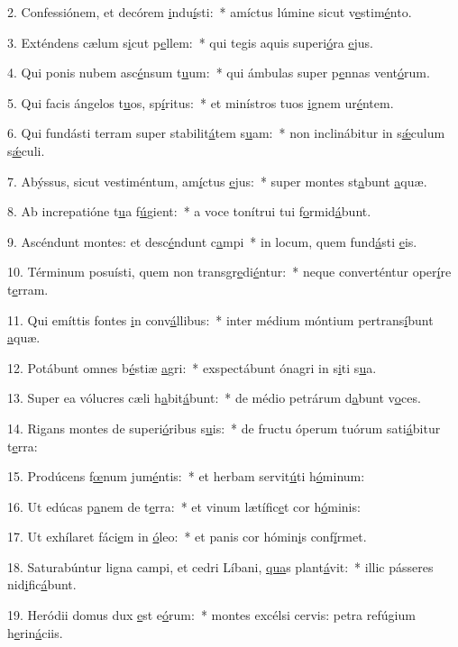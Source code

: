 2. Confessiónem, et decórem \uline{i}ndu\uline{í}sti:~* amíctus lúmine sicut v\uline{e}stim\uline{é}nto.\par 
3. Exténdens cælum s\uline{i}cut p\uline{e}llem:~* qui tegis aquis superi\uline{ó}ra \uline{e}jus.\par 
4. Qui ponis nubem asc\uline{é}nsum t\uline{u}um:~* qui ámbulas super p\uline{e}nnas vent\uline{ó}rum.\par 
5. Qui facis ángelos t\uline{u}os, sp\uline{í}ritus:~* et minístros tuos \uline{i}gnem ur\uline{é}ntem.\par 
6. Qui fundásti terram super stabilit\uline{á}tem s\uline{u}am:~* non inclinábitur in s\uline{ǽ}culum s\uline{ǽ}culi.\par 
7. Abýssus, sicut vestiméntum, am\uline{í}ctus \uline{e}jus:~* super montes st\uline{a}bunt \uline{a}quæ.\par 
8. Ab increpatióne t\uline{u}a f\uline{ú}gient:~* a voce tonítrui tui f\uline{o}rmid\uline{á}bunt.\par 
9. Ascéndunt montes: et desc\uline{é}ndunt c\uline{a}mpi~* in locum, quem fund\uline{á}sti \uline{e}is.\par 
10. Términum posuísti, quem non transgr\uline{e}di\uline{é}ntur:~* neque converténtur oper\uline{í}re t\uline{e}rram.\par 
11. Qui emíttis fontes \uline{i}n conv\uline{á}llibus:~* inter médium móntium pertrans\uline{í}bunt \uline{a}quæ.\par 
12. Potábunt omnes b\uline{é}stiæ \uline{a}gri:~* exspectábunt ónagri in s\uline{i}ti s\uline{u}a.\par 
13. Super ea vólucres cæli h\uline{a}bit\uline{á}bunt:~* de médio petrárum d\uline{a}bunt v\uline{o}ces.\par 
14. Rigans montes de superi\uline{ó}ribus s\uline{u}is:~* de fructu óperum tuórum sati\uline{á}bitur t\uline{e}rra:\par 
15. Prodúcens f\uline{œ}num jum\uline{é}ntis:~* et herbam servit\uline{ú}ti h\uline{ó}minum:\par 
16. Ut edúcas p\uline{a}nem de t\uline{e}rra:~* et vinum lætífic\uline{e}t cor h\uline{ó}minis:\par 
17. Ut exhílaret fáci\uline{e}m in \uline{ó}leo:~* et panis cor hómin\uline{i}s conf\uline{í}rmet.\par 
18. Saturabúntur ligna campi, et cedri Líbani, \uline{qua}s plant\uline{á}vit:~* illic pásseres nid\uline{i}fic\uline{á}bunt.\par 
19. Heródii domus dux \uline{e}st e\uline{ó}rum:~* montes excélsi cervis: petra refúgium h\uline{e}rin\uline{á}ciis.\par 
